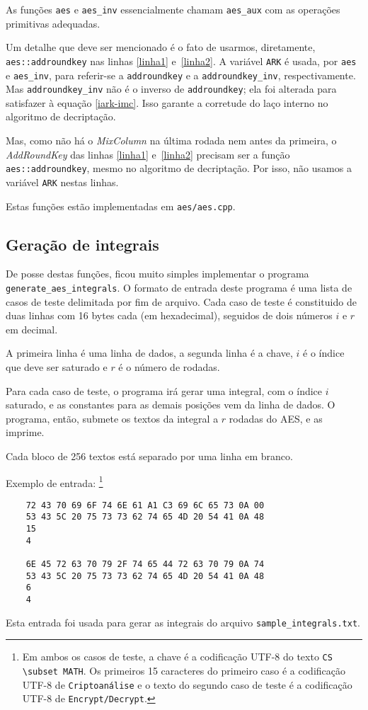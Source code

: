\documentclass{article}
\begin{document}
As funções \verb"aes" e \verb"aes_inv" essencialmente chamam \verb"aes_aux"
com as operações primitivas adequadas.

Um detalhe que deve ser mencionado é o fato de usarmos, diretamente,
\verb"aes::addroundkey" nas linhas \ref{linha1} e~\ref{linha2}.
A variável \verb"ARK" é usada,
por \verb"aes" e \verb"aes_inv",
para referir-se a \verb"addroundkey" e a \verb"addroundkey_inv",
respectivamente.
Mas \verb"addroundkey_inv" não é o inverso de \verb"addroundkey";
ela foi alterada para satisfazer à equação \ref{iark-imc}.
Isso garante a corretude do laço interno no algoritmo de decriptação.

Mas, como não há o \emph{MixColumn} na última rodada
nem antes da primeira,
o \emph{AddRoundKey} das linhas \ref{linha1} e~\ref{linha2}
precisam ser a função \verb"aes::addroundkey",
mesmo no algoritmo de decriptação.
Por isso, não usamos a variável \verb"ARK" nestas linhas.

Estas funções estão implementadas em \verb"aes/aes.cpp".

\subsection{Geração de integrais}

De posse destas funções,
ficou muito simples implementar o programa \verb"generate_aes_integrals".
O formato de entrada deste programa é uma lista de casos de teste
delimitada por fim de arquivo.
Cada caso de teste é constituido de duas linhas com 16 bytes cada (em hexadecimal),
seguidos de dois números $i$ e $r$ em decimal.

A primeira linha é uma linha de dados,
a segunda linha é a chave,
$i$ é o índice que deve ser saturado e $r$ é o número de rodadas.

Para cada caso de teste,
o programa irá gerar uma integral, com o índice $i$ saturado,
e as constantes para as demais posições vem da linha de dados.
O programa, então, submete os textos da integral a $r$ rodadas do AES,
e as imprime.

Cada bloco de 256 textos está separado por uma linha em branco.

Exemplo de entrada:
\footnote{
    Em ambos os casos de teste, a chave é a codificação UTF-8 do texto
    \texttt{CS \textbackslash{}subset MATH}.
    Os primeiros 15 caracteres do primeiro caso é a codificação UTF-8
    de \texttt{Criptoanálise}
    e o texto do segundo caso de teste é a codificação UTF-8
    de \texttt{Encrypt/Decrypt}.
}
\begin{verbatim}
    72 43 70 69 6F 74 6E 61 A1 C3 69 6C 65 73 0A 00
    53 43 5C 20 75 73 73 62 74 65 4D 20 54 41 0A 48
    15
    4

    6E 45 72 63 70 79 2F 74 65 44 72 63 70 79 0A 74
    53 43 5C 20 75 73 73 62 74 65 4D 20 54 41 0A 48
    6
    4
\end{verbatim}
Esta entrada foi usada para gerar as integrais do arquivo
\verb"sample_integrals.txt".
\end{document}
